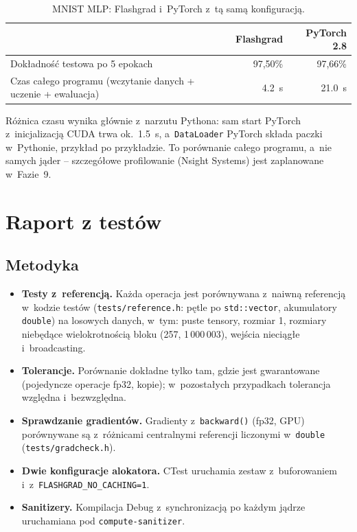 \documentclass[11pt,a4paper]{article}
\begin{document}
\begin{table}[H]
\centering
\caption{MNIST MLP: Flashgrad i~PyTorch z~tą samą konfiguracją.}
\label{tab:mnist}
\begin{tabular}{@{}lrr@{}}
\toprule
 & \textbf{Flashgrad} & \textbf{PyTorch 2.8} \\
\midrule
Dokładność testowa po 5 epokach & 97,50\% & 97,66\% \\
Czas całego programu (wczytanie danych + uczenie + ewaluacja) & \SI{4.2}{s} & \SI{21.0}{s} \\
\bottomrule
\end{tabular}
\end{table}

Różnica czasu wynika głównie z~narzutu Pythona: sam start PyTorch z~inicjalizacją CUDA
trwa ok.\ \SI{1.5}{s}, a~\texttt{DataLoader} PyTorch składa paczki w~Pythonie, przykład po
przykładzie. To porównanie całego programu, a~nie samych jąder -- szczegółowe
profilowanie (Nsight Systems) jest zaplanowane w~Fazie~9.

\section{Raport z testów}

\subsection{Metodyka}

\begin{itemize}[leftmargin=*]
\item \textbf{Testy z~referencją.} Każda operacja jest porównywana z~naiwną referencją
  w~kodzie testów (\texttt{tests/reference.h}: pętle po \texttt{std::vector},
  akumulatory \texttt{double}) na losowych danych, w~tym: puste tensory, rozmiar 1,
  rozmiary niebędące wielokrotnością bloku (257, 1\,000\,003), wejścia nieciągłe
  i~broadcasting.
\item \textbf{Tolerancje.} Porównanie dokładne tylko tam, gdzie jest gwarantowane
  (pojedyncze operacje fp32, kopie); w~pozostałych przypadkach tolerancja względna
  i~bezwzględna.
\item \textbf{Sprawdzanie gradientów.} Gradienty z~\texttt{backward()} (fp32, GPU)
  porównywane są z~różnicami centralnymi referencji liczonymi w~\texttt{double}
  (\texttt{tests/gradcheck.h}).
\item \textbf{Dwie konfiguracje alokatora.} CTest uruchamia zestaw z~buforowaniem
  i~z~\texttt{FLASHGRAD\_NO\_CACHING=1}.
\item \textbf{Sanitizery.} Kompilacja Debug z~synchronizacją po każdym jądrze uruchamiana
  pod \texttt{compute-sanitizer}.
\end{itemize}
\end{document}
